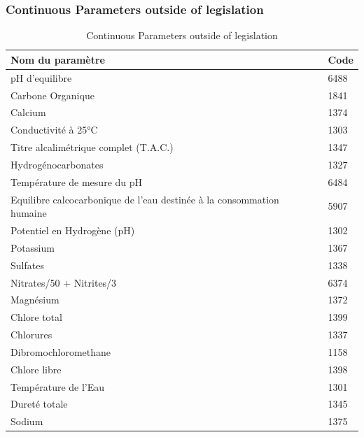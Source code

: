 \documentclass{article}
\begin{document}
\subsubsection*{Continuous Parameters outside of legislation}
\begin{table}[H]
\centering
\begin{tabular}{|l|l|}
\hline
\textbf{Nom du paramètre} & \textbf{Code} \\
\hline
pH d'equilibre & 6488 \\
Carbone Organique & 1841 \\
Calcium & 1374 \\
Conductivité à 25°C & 1303 \\
Titre alcalimétrique complet (T.A.C.) & 1347 \\
Hydrogénocarbonates & 1327 \\
Température de mesure du pH & 6484 \\
Equilibre calcocarbonique de l’eau destinée à la consommation humaine & 5907 \\
Potentiel en Hydrogène (pH) & 1302 \\
Potassium & 1367 \\
Sulfates & 1338 \\
Nitrates/50 + Nitrites/3 & 6374 \\
Magnésium & 1372 \\
Chlore total & 1399 \\
Chlorures & 1337 \\
Dibromochloromethane & 1158 \\
Chlore libre & 1398 \\
Température de l'Eau & 1301 \\
Dureté totale & 1345 \\
Sodium & 1375 \\
\hline
\end{tabular}
\caption{Continuous Parameters outside of legislation}
\end{table}
\end{document}
